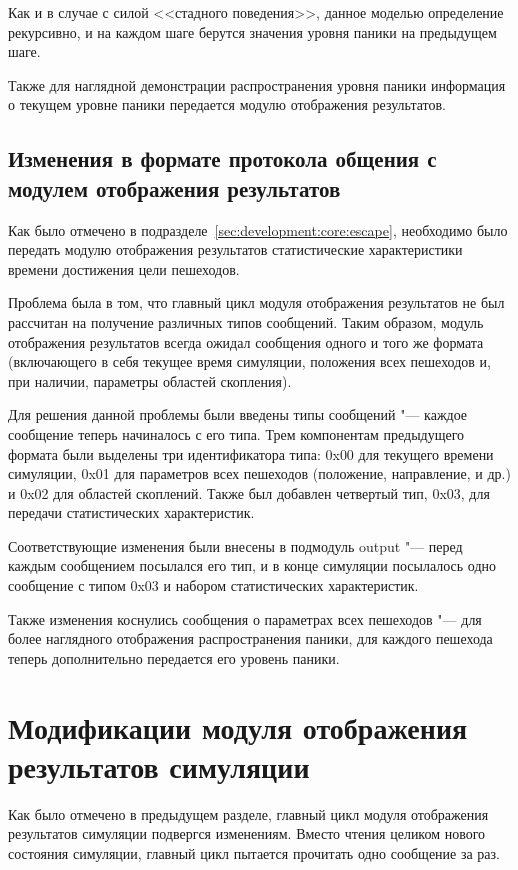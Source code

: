 Как и в случае с силой <<стадного поведения>>, данное моделью определение рекурсивно,
и на каждом шаге берутся значения уровня паники на предыдущем шаге.

Также для наглядной демонстрации распространения уровня паники информация о текущем уровне паники передается модулю отображения результатов.

\subsection{Изменения в формате протокола общения с модулем отображения результатов}
\label{sec:development:core:output}

Как было отмечено в подразделе~\ref{sec:development:core:escape}, необходимо было передать модулю отображения результатов
статистические характеристики времени достижения цели пешеходов.

Проблема была в том, что главный цикл модуля отображения результатов не был рассчитан на получение различных типов сообщений.
Таким образом, модуль отображения результатов всегда ожидал сообщения одного и того же формата
(включающего в себя текущее время симуляции, положения всех пешеходов и, при наличии, параметры областей скопления).

Для решения данной проблемы были введены типы сообщений "--- каждое сообщение теперь начиналось с его типа.
Трем компонентам предыдущего формата были выделены три идентификатора типа:
0x00 для текущего времени симуляции, 0x01 для параметров всех пешеходов (положение, направление, и др.) и 0x02 для областей скоплений.
Также был добавлен четвертый тип, 0x03, для передачи статистических характеристик.

Соответствующие изменения были внесены в подмодуль out\-put "--- перед каждым сообщением посылался его тип,
и в конце симуляции посылалось одно сообщение с типом 0x03 и набором статистических характеристик.

Также изменения коснулись сообщения о параметрах всех пешеходов "--- для более наглядного отображения распространения паники,
для каждого пешехода теперь дополнительно передается его уровень паники.

\section{Модификации модуля отображения результатов симуляции}
\label{sec:development:animator}

Как было отмечено в предыдущем разделе, главный цикл модуля отображения результатов симуляции подвергся изменениям.
Вместо чтения целиком нового состояния симуляции, главный цикл пытается прочитать одно сообщение за раз.

